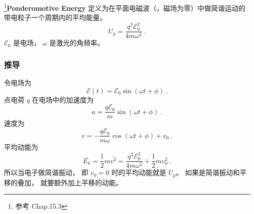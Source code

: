

\footnote{参考 \cite{Bransden} Chap.15.3}\textbf{Ponderomotive Energy} 定义为在平面电磁波（，磁场为零）中做简谐运动的带电粒子一个周期内的平均能量。
\begin{equation}\label{eq_Ponder_1}
U_p = \frac{q^2 \mathcal E_0^2}{4m\omega^2}~.
\end{equation}
$\mathcal E_0$ 是电场， $\omega$ 是激光的角频率。

\subsubsection{推导}
令电场为
\begin{equation}
\mathcal E(t) = \mathcal E_0 \sin(\omega t + \phi)~.
\end{equation}
点电荷 $q$ 在电场中的加速度为
\begin{equation}
a = \frac{q\mathcal E_0}{m} \sin(\omega t + \phi)~.
\end{equation}
速度为
\begin{equation}
v = -\frac{q\mathcal E_0}{m\omega} \cos(\omega t + \phi) + v_0~.
\end{equation}
平均动能为
\begin{equation}
\overline{E_k} = \frac{1}{2}m \overline{v^2} = \frac{q^2\mathcal E_0^2}{4m\omega^2} + \frac{1}{2}mv_0^2~.
\end{equation}
所以当电子做简谐振动， 即 $v_0 = 0$ 时的平均动能就是 $U_p$。 如果是简谐振动和平移的叠加， 就要额外加上平移的动能。
